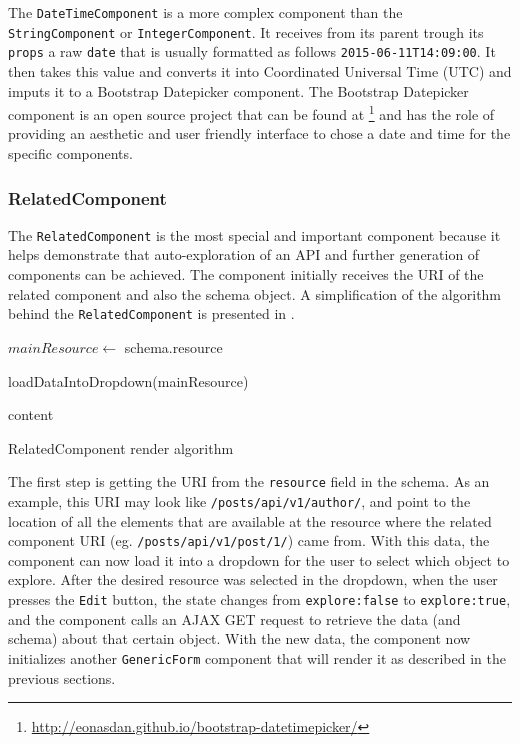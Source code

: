 The \texttt{DateTimeComponent} is a more complex component than the \texttt{StringComponent} or \texttt{IntegerComponent}. It receives from its parent trough its \texttt{props} a raw \texttt{date} that is usually formatted as follows \texttt{2015-06-11T14:09:00}. It then takes this value and converts it into 
Coordinated Universal Time (UTC) and imputs it to a Bootstrap Datepicker component. The Bootstrap Datepicker component is an open source project that can be found at \footnote{\url{http://eonasdan.github.io/bootstrap-datetimepicker/}} and has the role of providing an aesthetic and user friendly interface to chose a date and time for the specific components.

\subsubsection{RelatedComponent}
\label{sub-sub-sec:related}

The \texttt{RelatedComponent} is the most special and important component because it helps demonstrate that auto-exploration of an API and further generation of components can be achieved. The component initially receives the URI of the related component and also the schema object. A simplification of the algorithm behind the \texttt{RelatedComponent} is presented in .

\begin{algorithm}[H]
	
	$mainResource \leftarrow $ schema.resource
	
	loadDataIntoDropdown(mainResource)
	
	\Return content
	\label{algo2}
	\caption{RelatedComponent render algorithm}
\end{algorithm}

The first step is getting the URI from the \texttt{resource} field in the schema. As an example, this URI may look like \texttt{/posts/api/v1/author/}, and point to the location of all the elements that are available at the resource where the related component URI (eg. \texttt{/posts/api/v1/post/1/}) came from. With this data, the component can now load it into a dropdown for the user to select which object to explore. After the desired resource was selected in the dropdown, when the user presses the \texttt{Edit} button, the state changes from \texttt{explore:false} to \texttt{explore:true}, and the component calls an AJAX GET request to retrieve the data (and schema) about that certain object. With the new data, the component now initializes another \texttt{GenericForm} component that will render it as described in the previous sections. 